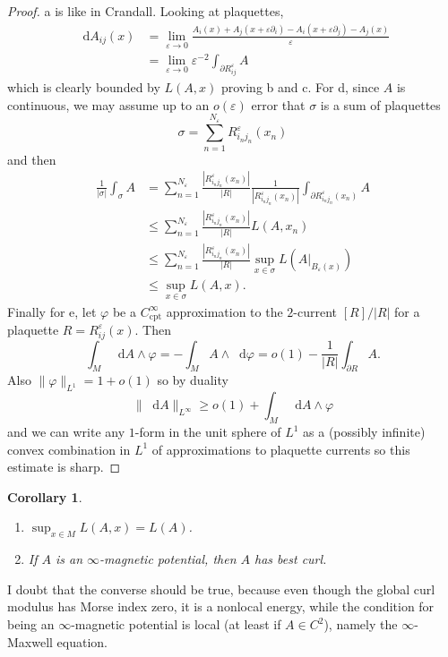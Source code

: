 \documentclass[reqno,11pt]{amsart}
\newcommand*\dif{\mathop{}\!\mathrm{d}}
\newcommand{\cpt}{\mathrm{cpt}}
\newtheorem{corollary}[theorem]{Corollary}
\theoremstyle{definition}
\numberwithin{equation}{section}
\begin{document}
\begin{proof}
a is like in Crandall. Looking at plaquettes,
\begin{align*}
\dif A_{ij}(x) 
&= \lim_{\varepsilon \to 0} \frac{A_i(x) + A_j(x + \varepsilon \partial_i) - A_i(x + \varepsilon \partial_j) - A_j(x)}{\varepsilon} \\
&= \lim_{\varepsilon \to 0} \varepsilon^{-2} \int_{\partial R_{ij}^\varepsilon} A
\end{align*}
which is clearly bounded by $L(A, x)$ proving b and c.
For d, since $A$ is continuous, we may assume up to an $o(\varepsilon)$ error that $\sigma$ is a sum of plaquettes 
$$\sigma = \sum_{n = 1}^{N_\varepsilon} R_{i_n j_n}^\varepsilon(x_n)$$
and then 
\begin{align*}
\frac{1}{|\sigma|} \int_\sigma A
&= \sum_{n = 1}^{N_\varepsilon} \frac{|R_{i_n j_n}^\varepsilon(x_n)|}{|R|} \frac{1}{|R_{i_n j_n}^\varepsilon(x_n)|} \int_{\partial R_{i_n j_n}^\varepsilon(x_n)} A \\
&\leq \sum_{n = 1}^{N_\varepsilon} \frac{|R_{i_n j_n}^\varepsilon(x_n)|}{|R|} L(A, x_n) \\
&\leq \sum_{n = 1}^{N_\varepsilon} \frac{|R_{i_n j_n}^\varepsilon(x_n)|}{|R|} \sup_{x \in \sigma} L(A|_{B_\varepsilon(x)}) \\
&\leq \sup_{x \in \sigma} L(A, x).
\end{align*}
Finally for e, let $\varphi$ be a $C^\infty_\cpt$ approximation to the $2$-current $[R]/|R|$ for a plaquette $R = R_{ij}^\varepsilon(x)$. Then 
$$\int_M \dif A \wedge \varphi = - \int_M A \wedge \dif \varphi = o(1) - \frac{1}{|R|} \int_{\partial R} A.$$
Also $\|\varphi\|_{L^1} = 1 + o(1)$ so by duality 
$$\|\dif A\|_{L^\infty} \geq o(1) + \int_M \dif A \wedge \varphi$$
and we can write any $1$-form in the unit sphere of $L^1$ as a (possibly infinite) convex combination in $L^1$ of approximations to plaquette currents so this estimate is sharp.
\end{proof}

\begin{corollary}
\begin{enumerate}
\item $\sup_{x \in M} L(A, x) = L(A)$.
\item If $A$ is an $\infty$-magnetic potential, then $A$ has best curl.
\end{enumerate}
\end{corollary}

I doubt that the converse should be true, because even though the global curl modulus has Morse index zero, it is a nonlocal energy, while the condition for being an $\infty$-magnetic potential is local (at least if $A \in C^2$), namely the $\infty$-Maxwell equation.
\end{document}

